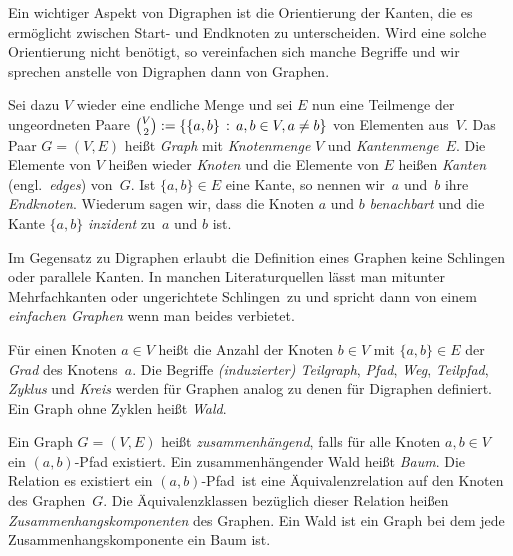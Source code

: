 \begin{bem}
Ein wichtiger Aspekt von Digraphen ist die Orientierung der Kanten, die es ermöglicht zwischen Start- und Endknoten zu unterscheiden.
Wird eine solche Orientierung nicht benötigt, so vereinfachen sich manche Begriffe und wir sprechen anstelle von Digraphen dann von Graphen.
\end{bem} 

\begin{defn} 
Sei dazu $V$ wieder eine endliche Menge und sei $E$ nun eine Teilmenge der ungeordneten Paare $\binom{V}{2}:= \left\{ \{a,b\} \,:\, a, b \in V, a \ne b \right\} $ von Elementen aus~$V$.
Das Paar $G=(V,E)$ heißt \emph{Graph} mit \emph{Knotenmenge} $V$ und \emph{Kantenmenge}~$E$.
Die Elemente von $V$ heißen wieder \emph{Knoten} und die Elemente von $E$ heißen \emph{Kanten} (engl.~\emph{edges}) von~$G$.
Ist $\{a,b\} \in E$ eine Kante, so nennen wir~$a$ und~$b$ ihre \emph{Endknoten}.
Wiederum sagen wir, dass die Knoten $a$ und $b$ \emph{benachbart} und die Kante $\{a,b\}$ \emph{inzident} zu~$a$ und $b$ ist.
\end{defn} 

\begin{bem}
Im Gegensatz zu Digraphen erlaubt die Definition eines Graphen keine Schlingen oder parallele Kanten.
In manchen Literaturquellen lässt man mitunter Mehrfachkanten oder \glqq ungerichtete Schlingen\grqq\ zu und spricht dann von einem \emph{einfachen Graphen} wenn man beides verbietet.
\end{bem}

\begin{defn} 
Für einen Knoten $a \in V$ heißt die Anzahl der Knoten $b \in V$ mit $\{a,b\} \in E$ der \emph{Grad} des Knotens~$a$.
Die Begriffe \emph{(induzierter) Teilgraph}, \emph{Pfad}, \emph{Weg}, \emph{Teilpfad}, \emph{Zyklus} und \emph{Kreis} werden für Graphen analog zu denen für Digraphen definiert.
Ein Graph ohne Zyklen heißt \emph{Wald}.
\end{defn}

\begin{defn} 
Ein Graph $G=(V,E)$ heißt \emph{zusammenhängend}, falls für alle Knoten $a, b \in V$ ein $(a,b)$-Pfad existiert.
Ein zusammenhängender Wald heißt \emph{Baum}.
Die Relation \glqq es existiert ein $(a,b)$-Pfad\grqq\ ist eine Äquivalenzrelation auf den Knoten des Graphen~$G$.
Die Äquivalenzklassen bezüglich dieser Relation heißen \emph{Zusammenhangskomponenten} des Graphen.
Ein Wald ist ein Graph bei dem jede Zusammenhangskomponente ein Baum ist.
\end{defn} 


